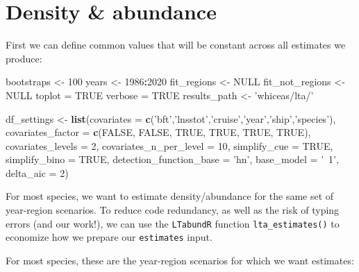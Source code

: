 \documentclass[
]{book}
\newenvironment{Shaded}{\begin{snugshade}}{\end{snugshade}}
\newcommand{\DataTypeTok}[1]{\textcolor[rgb]{0.13,0.29,0.53}{#1}}
\newcommand{\DecValTok}[1]{\textcolor[rgb]{0.00,0.00,0.81}{#1}}
\newcommand{\KeywordTok}[1]{\textcolor[rgb]{0.13,0.29,0.53}{\textbf{#1}}}
\newcommand{\NormalTok}[1]{#1}
\newcommand{\OperatorTok}[1]{\textcolor[rgb]{0.81,0.36,0.00}{\textbf{#1}}}
\newcommand{\OtherTok}[1]{\textcolor[rgb]{0.56,0.35,0.01}{#1}}
\newcommand{\StringTok}[1]{\textcolor[rgb]{0.31,0.60,0.02}{#1}}
\begin{document}
\hypertarget{density-abundance}{%
\section*{Density \& abundance}\label{density-abundance}}

First we can define common values that will be constant across all estimates we produce:

\begin{Shaded}
\begin{Highlighting}[]
\NormalTok{bootstraps <-}\StringTok{ }\DecValTok{100}
\NormalTok{years <-}\StringTok{ }\DecValTok{1986}\OperatorTok{:}\DecValTok{2020}
\NormalTok{fit_regions <-}\StringTok{ }\OtherTok{NULL}
\NormalTok{fit_not_regions <-}\StringTok{ }\OtherTok{NULL}
\NormalTok{toplot =}\StringTok{ }\OtherTok{TRUE}
\NormalTok{verbose =}\StringTok{ }\OtherTok{TRUE}
\NormalTok{results_path <-}\StringTok{ 'whiceas/lta/'}

\NormalTok{df_settings <-}
\StringTok{  }\KeywordTok{list}\NormalTok{(}\DataTypeTok{covariates =} \KeywordTok{c}\NormalTok{(}\StringTok{'bft'}\NormalTok{,}\StringTok{'lnsstot'}\NormalTok{,}\StringTok{'cruise'}\NormalTok{,}\StringTok{'year'}\NormalTok{,}\StringTok{'ship'}\NormalTok{,}\StringTok{'species'}\NormalTok{),}
       \DataTypeTok{covariates_factor =} \KeywordTok{c}\NormalTok{(}\OtherTok{FALSE}\NormalTok{, }\OtherTok{FALSE}\NormalTok{, }\OtherTok{TRUE}\NormalTok{, }\OtherTok{TRUE}\NormalTok{, }\OtherTok{TRUE}\NormalTok{, }\OtherTok{TRUE}\NormalTok{),}
       \DataTypeTok{covariates_levels =} \DecValTok{2}\NormalTok{,}
       \DataTypeTok{covariates_n_per_level =} \DecValTok{10}\NormalTok{,}
       \DataTypeTok{simplify_cue =} \OtherTok{TRUE}\NormalTok{,}
       \DataTypeTok{simplify_bino =} \OtherTok{TRUE}\NormalTok{,}
       \DataTypeTok{detection_function_base =} \StringTok{'hn'}\NormalTok{,}
       \DataTypeTok{base_model =} \StringTok{'~1'}\NormalTok{,}
       \DataTypeTok{delta_aic =} \DecValTok{2}\NormalTok{)}
\end{Highlighting}
\end{Shaded}

For most species, we want to estimate density/abundance for the same set of year-region scenarios. To reduce code redundancy, as well as the risk of typing errors (and our work!), we can use the \texttt{LTabundR} function \texttt{lta\_estimates()} to economize how we prepare our \texttt{estimates} input.

For most species, these are the year-region scenarios for which we want estimates:
\end{document}
